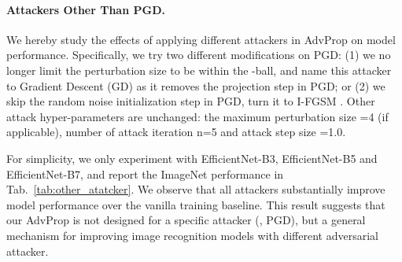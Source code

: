 \documentclass[10pt,twocolumn,letterpaper]{article}
\begin{document}
\begin{table}[h!]
\vspace{-0.7em}
\vskip 0.05in
\caption{Both AutoAugment and AdvProp improves model performance over the Inception-style pre-processing baseline on ImageNet. Large Models generally perform better with AdvProp than AutoAugment. Training with a combination of both is better than using AdvProp alone on all networks.}
\vspace{-0.7em}
\label{tab:data_aug}
\end{table}



\paragraph{Attackers Other Than PGD.} 
We hereby study the effects of applying different attackers in AdvProp on model performance. Specifically, we try two different modifications on PGD: (1) we no longer limit the perturbation size to be within the -ball, and name this attacker to Gradient Descent (GD) as it removes the projection step in PGD; or (2) we skip the random noise initialization step in PGD, turn it to I-FGSM \cite{Kurakin2017}. Other attack hyper-parameters are unchanged: the maximum perturbation size =4 (if applicable), number of attack iteration n=5 and attack step size =1.0.

For simplicity, we only experiment with EfficientNet-B3, EfficientNet-B5 and EfficientNet-B7, and report the ImageNet performance in Tab.~\ref{tab:other_atatcker}. We observe that all attackers substantially improve model performance over the vanilla training baseline. This result suggests that our AdvProp is not designed for a specific attacker (\eg, PGD), but a general mechanism for improving image recognition models with different adversarial attacker.
\end{document}
